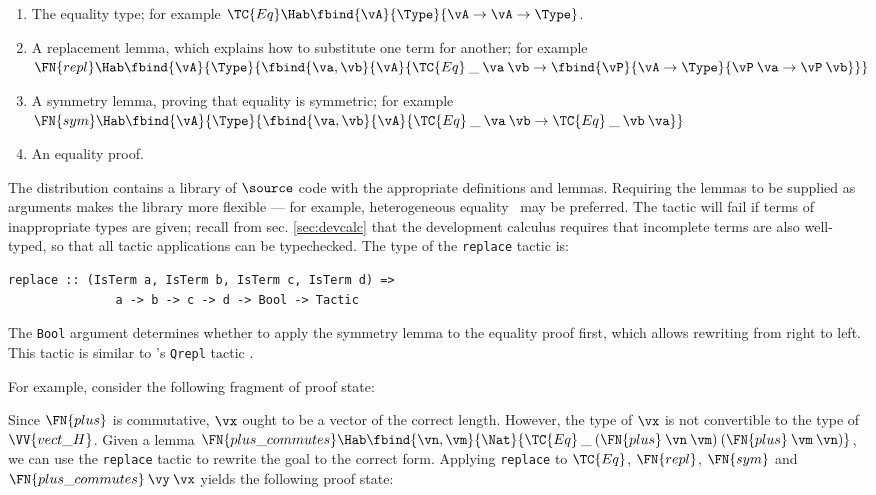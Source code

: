 \begin{enumerate}
\item The equality type; for example
  $\TC{Eq}\Hab\fbind{\vA}{\Type}{\vA\to\vA\to\Type}$.
\item A replacement lemma, which explains how to substitute one term
  for another; for example\\
  $\FN{repl}\Hab\fbind{\vA}{\Type}{
    \fbind{\va,\vb}{\vA}{
	\TC{Eq}\:\_\:\va\:\vb\to\fbind{\vP}{\vA\to\Type}{
	  \vP\:\va\to\vP\:\vb}}}$
\item A symmetry lemma, proving that equality is symmetric; for
  example\\
  $\FN{sym}\Hab\fbind{\vA}{\Type}{
      \fbind{\va,\vb}{\vA}{\TC{Eq}\:\_\:\va\:\vb\to\TC{Eq}\:\_\:\vb\:\va}}$
\item An equality proof.
\end{enumerate}

The \Ivor{} distribution contains a library of $\source$ code with the
appropriate definitions and lemmas. Requiring the lemmas to be
supplied as arguments makes the library more flexible --- for example,
heterogeneous equality~\cite{mcbride-thesis} may be preferred. The
tactic will fail if terms of inappropriate types are given; recall
from sec. \ref{sec:devcalc} that the development calculus requires
that incomplete terms are also well-typed, so that all tactic
applications can be typechecked. The type of the \texttt{replace}
tactic is:

\begin{verbatim}
replace :: (IsTerm a, IsTerm b, IsTerm c, IsTerm d) =>
               a -> b -> c -> d -> Bool -> Tactic
\end{verbatim}

The \texttt{Bool} argument determines whether to apply the symmetry
lemma to the equality proof first, which allows rewriting from right
to left.
This  tactic is
similar to \Lego{}'s \texttt{Qrepl} tactic \cite{lego-manual}.

For example, consider the following fragment of proof state:


Since $\FN{plus}$ is commutative, $\vx$ ought to be a vector of the
correct length. However, the type of $\vx$ is not convertible to the
type of $\VV{vect\_H}$. Given a lemma $\FN{plus\_commutes}\Hab
\fbind{\vn,\vm}{\Nat}{\TC{Eq}\:\_\:(\FN{plus}\:\vn\:\vm)\:(\FN{plus}\:\vm\:\vn)}$,
we can use the \texttt{replace} tactic to rewrite the goal to the
correct form. Applying \texttt{replace} to $\TC{Eq}$, $\FN{repl}$,
$\FN{sym}$ and $\FN{plus\_commutes}\:\vy\:\vx$ yields the following
proof state:

